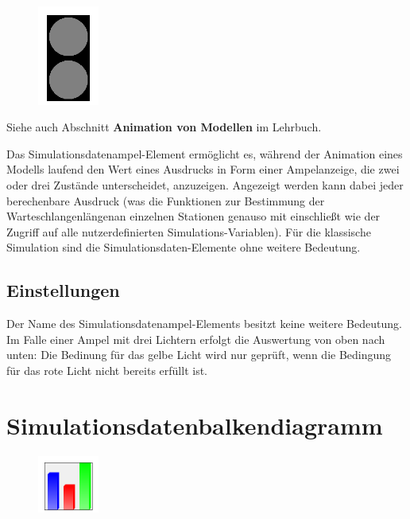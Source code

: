 \begin{figure}
\vspace{-22pt}
\includegraphics[width=2cm]{imageModelElementAnimationTrafficLights.png}
\vspace{-22pt}
\end{figure}

Siehe auch Abschnitt \textbf{Animation von Modellen} im Lehrbuch.

Das Simulationsdatenampel-Element ermöglicht es, während der Animation eines Modells laufend den Wert
eines Ausdrucks in Form einer Ampelanzeige, die zwei oder drei Zustände unterscheidet, anzuzeigen.
Angezeigt werden kann dabei jeder berechenbare Ausdruck (was die Funktionen zur Bestimmung der
Warteschlangenlängenan einzelnen Stationen genauso mit einschließt wie der Zugriff auf alle nutzerdefinierten
Simulations-Variablen). Für die klassische Simulation sind die Simulationsdaten-Elemente ohne weitere Bedeutung.

\subsection*{Einstellungen}

Der Name des Simulationsdatenampel-Elements besitzt keine weitere Bedeutung. Im Falle einer Ampel mit drei
Lichtern erfolgt die Auswertung von oben nach unten: Die Bedinung für das gelbe Licht wird nur geprüft,
wenn die Bedingung für das rote Licht nicht bereits erfüllt ist.


\section{Simulationsdatenbalkendiagramm}
\label{ref:ModelElementAnimationBarChart}

\begin{figure}
\vspace{-22pt}
\includegraphics[width=2cm]{imageModelElementAnimationBarChart.png}
\vspace{-22pt}
\end{figure}

